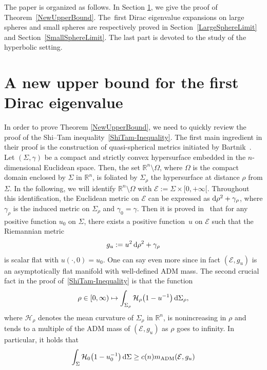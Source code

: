 \documentclass[pdftex]{sigma}
\numberwithin{equation}{section}
\begin{document}
The paper is organized as follows. In Section \ref{UpperBoundDiracEuclidean}, we give the proof of Theorem~\ref{NewUpperBound}. The~first Dirac eigenvalue expansions on large spheres and small spheres are respectively proved in Section~\ref{LargeSphereLimit} and Section~\ref{SmallSphereLimit}. The last part is devoted to the study of the hyperbolic setting.
\section{A new upper bound for the first Dirac eigenvalue}\label{UpperBoundDiracEuclidean}

In order to prove Theorem \ref{NewUpperBound}, we need to quickly review the proof of the Shi--Tam inequality~\eqref{ShiTam-Inequality}. The first main ingredient in their proof is the construction of quasi-spherical metrics initiated by Bartnik~\cite{Bartnik4}. Let $(\Sigma,\gamma)$ be a compact and strictly convex hypersurface embedded in the $n$-dimensional Euclidean space. Then, the set $\mathbb{R}^n\setminus\Omega$, where $\Omega$ is the compact domain enclosed by $\Sigma$ in $\mathbb{R}^n$, is foliated by $\Sigma_{\rho}$ the hypersurface at distance $\rho$ from $\Sigma$. In the following, we will identify $\mathbb{R}^n\setminus\Omega$ with $\mathcal{E}:=\Sigma\times[0,+\infty[$. Throughout this identification, the Euclidean metric on $\mathcal{E}$ can be expressed as ${\rm d}\rho^2+\gamma_\rho$, where $\gamma_\rho$ is the induced metric on $\Sigma_\rho$ and $\gamma_0=\gamma$. Then it is proved in~\cite{ShiTam1} that for any positive function $u_0$ on $\Sigma$, there exists a positive function~$u$ on $\mathcal{E}$ such that the Riemannian metric
\begin{gather}\label{QS-metric}
g_u:=u^2\,{\rm d}\rho^2+\gamma_\rho
\end{gather}
is scalar flat with $u(\cdot,0)=u_0$. One can say even more since in fact $(\mathcal{E},g_u)$ is an asymptotically flat manifold with well-defined ADM mass. The second crucial fact in the proof of~\eqref{ShiTam-Inequality} is that the function
\begin{gather*}
\rho\in[0,\infty)\mapsto\int_{\Sigma_\rho}\mathcal{H}_\rho\big(1-u^{-1}\big)\,{\rm d}\Sigma_\rho,
\end{gather*}
where $\mathcal{H}_\rho$ denotes the mean curvature of $\Sigma_\rho$ in $\mathbb{R}^n$, is nonincreasing in $\rho$ and tends to a multiple of the ADM mass of $(\mathcal{E},g_u)$ as $\rho$ goes to infinity. In particular, it holds that
\begin{gather*}%
\int_{\Sigma}\mathcal{H}_0\big(1-u^{-1}_0\big)\,{\rm d}\Sigma\geq c(n)m_{\rm ADM}(\mathcal{E},g_u)
\end{gather*}
\end{document}
